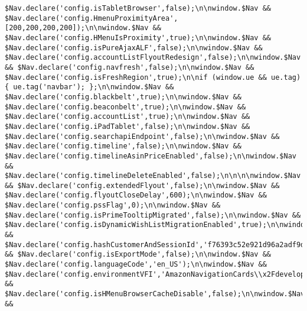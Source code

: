 \documentclass[
]{article}
\begin{document}
\begin{verbatim}
$Nav.declare('config.isTabletBrowser',false);\n\nwindow.$Nav && $Nav.declare('config.HmenuProximityArea',[200,200,200,200]);\n\nwindow.$Nav && $Nav.declare('config.HMenuIsProximity',true);\n\nwindow.$Nav && $Nav.declare('config.isPureAjaxALF',false);\n\nwindow.$Nav && $Nav.declare('config.accountListFlyoutRedesign',false);\n\nwindow.$Nav && $Nav.declare('config.navfresh',false);\n\nwindow.$Nav && $Nav.declare('config.isFreshRegion',true);\n\nif (window.ue && ue.tag) { ue.tag('navbar'); };\n\nwindow.$Nav && $Nav.declare('config.blackbelt',true);\n\nwindow.$Nav && $Nav.declare('config.beaconbelt',true);\n\nwindow.$Nav && $Nav.declare('config.accountList',true);\n\nwindow.$Nav && $Nav.declare('config.iPadTablet',false);\n\nwindow.$Nav && $Nav.declare('config.searchapiEndpoint',false);\n\nwindow.$Nav && $Nav.declare('config.timeline',false);\n\nwindow.$Nav && $Nav.declare('config.timelineAsinPriceEnabled',false);\n\nwindow.$Nav && $Nav.declare('config.timelineDeleteEnabled',false);\n\n\n\nwindow.$Nav && $Nav.declare('config.extendedFlyout',false);\n\nwindow.$Nav && $Nav.declare('config.flyoutCloseDelay',600);\n\nwindow.$Nav && $Nav.declare('config.pssFlag',0);\n\nwindow.$Nav && $Nav.declare('config.isPrimeTooltipMigrated',false);\n\nwindow.$Nav && $Nav.declare('config.isDynamicWishListMigrationEnabled',true);\n\nwindow.$Nav && $Nav.declare('config.hashCustomerAndSessionId','f76393c52e921d96a2adf9d1713aaa5617b1b703');\n\nwindow.$Nav && $Nav.declare('config.isExportMode',false);\n\nwindow.$Nav && $Nav.declare('config.languageCode','en_US');\n\nwindow.$Nav && $Nav.declare('config.environmentVFI','AmazonNavigationCards\\x2Fdevelopment\\x40B6097992874\\x2DAL2_x86_64');\n\n\n\nwindow.$Nav && $Nav.declare('config.isHMenuBrowserCacheDisable',false);\n\nwindow.$Nav && 
\end{verbatim}
\end{document}
